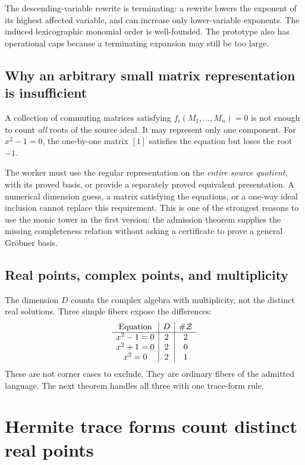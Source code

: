 The descending-variable rewrite is terminating: a rewrite lowers the exponent of its highest affected variable, and can increase only lower-variable exponents. The induced lexicographic monomial order is well-founded. The prototype also has operational caps because a terminating expansion may still be too large.

\subsection{Why an arbitrary small matrix representation is insufficient}

A collection of commuting matrices satisfying $f_i(M_1,\ldots,M_n)=0$ is not enough to count \emph{all} roots of the source ideal. It may represent only one component. For $x^2-1=0$, the one-by-one matrix $[1]$ satisfies the equation but loses the root $-1$.

The worker must use the regular representation on the \emph{entire source quotient}, with its proved basis, or provide a separately proved equivalent presentation. A numerical dimension guess, a matrix satisfying the equations, or a one-way ideal inclusion cannot replace this requirement. This is one of the strongest reasons to use the monic tower in the first version: the admission theorem supplies the missing completeness relation without asking a certificate to prove a general Gr\"obner basis.

\subsection{Real points, complex points, and multiplicity}

The dimension $D$ counts the complex algebra with multiplicity, not the distinct real solutions. Three simple fibers expose the differences:
\[
\begin{array}{c|c|c}
\text{Equation}&D&\#\mathcal Z\\\hline
x^2-1=0&2&2\\
x^2+1=0&2&0\\
x^2=0&2&1
\end{array}
\]
These are not corner cases to exclude. They are ordinary fibers of the admitted language. The next theorem handles all three with one trace-form rule.

\section{Hermite trace forms count distinct real points}\label{sec:hermite}

